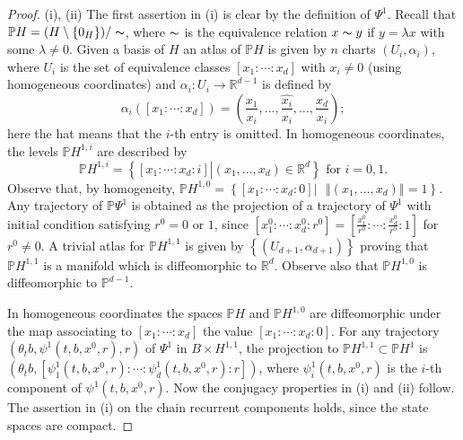 	\begin{proof}
		(i), (ii) The first assertion in (i) is clear by the definition of $\Psi^{1}$.
		Recall that $\mathbb{P}H=(H\setminus\{0_{H}\})/\thicksim$, where $\thicksim$ is
		the equivalence relation $x\thicksim y$ if $y=\lambda x$ with some
		$\lambda\not =0$. Given a basis of $H$ an atlas of $\mathbb{P}H$ is given by
		$n$ charts $(U_{i},\alpha_{i})$, where $U_{i}$ is the set of equivalence
		classes $[x_{1}:\cdots:x_{d}]$ with $x_{i}\not =0$ (using homogeneous
		coordinates) and $\alpha_{i}:U_{i}\rightarrow\mathbb{R}^{d-1}$ is defined by
		\[
		\alpha_{i}([x_{1}:\cdots:x_{d}])=\left(  \frac{x_{1}}{x_{i}},\ldots
		,\widehat{\frac{x_{i}}{x_{i}}},\ldots,\frac{x_{d}}{x_{i}}\right)  ;
		\]
		here the hat means that the $i$-th entry is omitted. In homogeneous
		coordinates, the levels $\mathbb{P}H^{1,i}$ are described by
		\[
		\mathbb{P}H^{1,i}=\left\{  [x_{1}:\cdots:x_{d}:i]\left\vert (x_{1}%
		,\ldots,x_{d})\in\mathbb{R}^{d}\right.  \right\}  \mbox{ for }i=0,1.
		\]
		Observe that, by homogeneity, $\mathbb{P}H^{1,0}=\left\{  [x_{1}:\cdots
		:x_{d}:0]\left\vert \mbox{ }\left\Vert (x_{1},\ldots,x_{d})\right\Vert
		=1\right.  \right\}  $. Any trajectory of $\mathbb{P}\Psi^{1}$ is obtained as
		the projection of a trajectory of $\Psi^{1}$ with initial condition satisfying
		$r^{0}=0$ or $1$, since $[x_{1}^{0}:\cdots:x_{d}^{0}:r^{0}]=[\frac{x_{1}^{0}%
		}{r^{0}}:\cdots:\frac{x_{d}^{0}}{r^{0}}:1]$ for $r^{0}\not =0$. A trivial
		atlas for $\mathbb{P}H^{1,1}$ is given by $\left\{  (U_{d+1},\alpha
		_{d+1})\right\}  $ proving that $\mathbb{P}H^{1,1}$ is a manifold which is
		diffeomorphic to $\mathbb{R}^{d}$. Observe also that $\mathbb{P}H^{1,0}$ is
		diffeomorphic to $\mathbb{P}^{d-1}$.
		
		In homogeneous coordinates the spaces $\mathbb{P}H$ and $\mathbb{P}H^{1,0}$
		are diffeomorphic under the map associating to $[x_{1}:\cdots:x_{d}]$ the
		value $[x_{1}:\cdots:x_{d}:0]$. For any trajectory $(\theta_{t}b,\psi
		^{1}(t,b,x^{0},r),r)$ of $\Psi^{1}$ in $B\times H^{1,1}$, the projection to
		$\mathbb{P}H^{1,1}\subset\mathbb{P}H^{1}$ is $(\theta_{t}b,[\psi_{1}
		^{1}(t,b,x^{0},r):\cdots:\psi_{d}^{1}(t,b,x^{0},r):r])$, where $\psi_{i}
		^{1}(t,b,x^{0},r)$ is the $i$-th component of $\psi^{1}(t,b,x^{0},r)$. Now the
		conjugacy properties in (i) and (ii) follow. The assertion in (i) on the chain
		recurrent components holds, since the state spaces are compact.
		

\end{proof}
